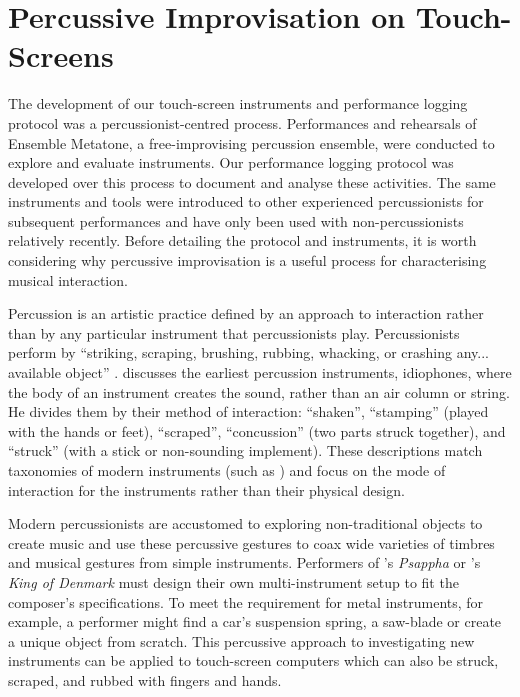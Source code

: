 \documentclass[graybox]{svmult}
\begin{document}
\section{Percussive Improvisation on Touch-Screens}
\label{sec:percussive-interaction}

The development of our touch-screen instruments and performance
logging protocol was a percussionist-centred process. Performances and
rehearsals of Ensemble Metatone, a free-improvising percussion
ensemble, were conducted to explore and evaluate instruments. Our
performance logging protocol was developed over this process to
document and analyse these activities. The same instruments and tools
were introduced to other experienced percussionists for subsequent
performances and have only been used with non-percussionists
relatively recently. Before detailing the protocol and instruments, it
is worth considering why percussive improvisation is a useful process
for characterising musical interaction.

Percussion is an artistic practice defined by an approach to
interaction rather than by any particular instrument that
percussionists play. Percussionists perform by ``striking, scraping,
brushing, rubbing, whacking, or crashing any... available
object'' \citep{Schick:2006fk}. \citet{Blades:1992kx} discusses
the earliest percussion instruments, idiophones, where the body of an
instrument creates the sound, rather than an air column or string. He
divides them by their method of interaction: ``shaken'', ``stamping''
(played with the hands or feet), ``scraped'', ``concussion'' (two
parts struck together), and ``struck'' (with a stick or non-sounding
implement). These descriptions match taxonomies of modern instruments
(such as \citet{Cook:1997vn}) and focus on the mode of interaction
for the instruments rather than their physical design.

Modern percussionists are accustomed to exploring non-traditional
objects to create music and use these percussive gestures to coax wide
varieties of timbres and musical gestures from simple instruments.
Performers of \citeauthor{Xenakis:1975uq}'s
\citeyearpar{Xenakis:1975uq} \emph{Psappha} or
\citeauthor{Feldman:1965uq}'s \citeyearpar{Feldman:1965uq} \emph{King
  of Denmark} must design their own multi-instrument setup to fit the
composer's specifications. To meet the requirement for metal
instruments, for example, a performer might find a car's suspension
spring, a saw-blade or create a unique object from scratch. This
percussive approach to investigating new instruments can be applied to
touch-screen computers which can also be struck, scraped, and rubbed
with fingers and hands.
\end{document}
